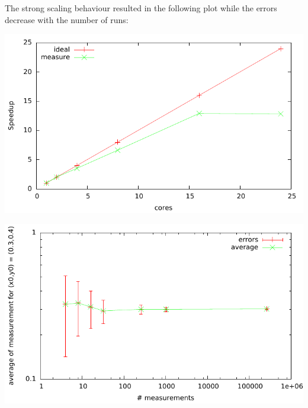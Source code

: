 \documentclass[12pt]{scrbook}
\begin{document}
The strong scaling behaviour resulted in the following plot while the errors decrease with the number of runs: \\
\begin{minipage}[!t]{0.5\textwidth}
\includegraphics[width=\textwidth, keepaspectratio]{strong_scaling.pdf}
\end{minipage}
\begin{minipage}[!t]{0.5	\textwidth}
\includegraphics[width=\textwidth]{errors.pdf}
\end{minipage}
\end{document}
